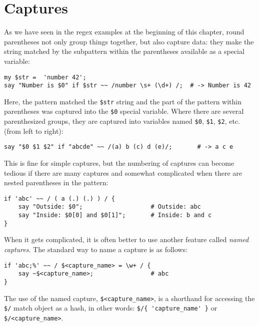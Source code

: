 \section{Captures}

As we have seen in the regex examples at the beginning 
of this chapter, round parentheses 
not only group things together, but also capture data: they 
make the string matched by the subpattern within 
the parentheses available as a special variable:

\begin{verbatim}
my $str =  'number 42';
say "Number is $0" if $str ~~ /number \s+ (\d+) /;  # -> Number is 42
\end{verbatim}
%

Here, the pattern matched the \verb'$str' string and the 
part of the pattern within parentheses was captured into 
the \verb'$0' special variable. Where there are several 
parenthesized groups, they are captured into variables 
named \verb'$0', \verb'$1',  \verb'$2', etc. (from 
left to right):

\begin{verbatim}
say "$0 $1 $2" if "abcde" ~~ /(a) b (c) d (e)/;       # -> a c e
\end{verbatim}
%

This is fine for simple captures, but the numbering of 
captures can become tedious if there are many captures and 
somewhat complicated when there are nested parentheses in 
the pattern:

\begin{verbatim}
if 'abc' ~~ / ( a (.) (.) ) / {
    say "Outside: $0";                   # Outside: abc
    say "Inside: $0[0] and $0[1]";       # Inside: b and c
}
\end{verbatim}

When it gets complicated, it is often better to use another 
feature called \emph{named captures}. The standard way to 
name a capture is as follows:

\begin{verbatim}
if 'abc;%' ~~ / $<capture_name> = \w+ / {
    say ~$<capture_name>;                # abc
}
\end{verbatim} 

The use of the named capture, \verb'$<capture_name>', 
is a shorthand for accessing the \verb'$/' match object as 
a hash, in other words: \verb"$/{ 'capture_name' }" or 
\verb'$/<capture_name>'.


